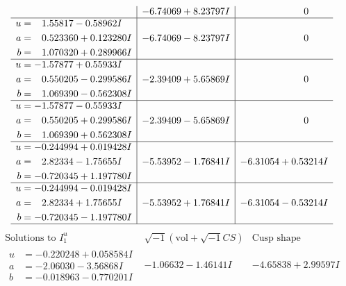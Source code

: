 \documentclass[1p]{elsarticle_modified}
\theoremstyle{definition}
\newcommand{\I}{\sqrt{-1}}
\begin{document}
$$\begin{array}{c|c|c}
 & -6.74069 + 8.23797 I & \phantom{-0.000000 } 0 \\ \hline\begin{aligned}
u &= \phantom{-}1.55817 - 0.58962 I \\
a &= \phantom{-}0.523360 + 0.123280 I \\
b &= \phantom{-}1.070320 + 0.289966 I\end{aligned}
 & -6.74069 - 8.23797 I & \phantom{-0.000000 } 0 \\ \hline\begin{aligned}
u &= -1.57877 + 0.55933 I \\
a &= \phantom{-}0.550205 - 0.299586 I \\
b &= \phantom{-}1.069390 - 0.562308 I\end{aligned}
 & -2.39409 + 5.65869 I & \phantom{-0.000000 } 0 \\ \hline\begin{aligned}
u &= -1.57877 - 0.55933 I \\
a &= \phantom{-}0.550205 + 0.299586 I \\
b &= \phantom{-}1.069390 + 0.562308 I\end{aligned}
 & -2.39409 - 5.65869 I & \phantom{-0.000000 } 0 \\ \hline\begin{aligned}
u &= -0.244994 + 0.019428 I \\
a &= \phantom{-}2.82334 - 1.75655 I \\
b &= -0.720345 + 1.197780 I\end{aligned}
 & -5.53952 - 1.76841 I & -6.31054 + 0.53214 I \\ \hline\begin{aligned}
u &= -0.244994 - 0.019428 I \\
a &= \phantom{-}2.82334 + 1.75655 I \\
b &= -0.720345 - 1.197780 I\end{aligned}
 & -5.53952 + 1.76841 I & -6.31054 - 0.53214 I\\
 \hline 
 \end{array}$$\newpage$$\begin{array}{c|c|c}  
\text{Solutions to }I^u_{1}& \I (\text{vol} + \sqrt{-1}CS) & \text{Cusp shape}\\
 \hline 
\begin{aligned}
u &= -0.220248 + 0.058584 I \\
a &= -2.06030 - 3.56868 I \\
b &= -0.018963 - 0.770201 I\end{aligned}
 & -1.06632 - 1.46141 I & -4.65838 + 2.99597 I \\ \hline\begin{aligned}

\end{aligned}
\end{array}$$
\end{document}
